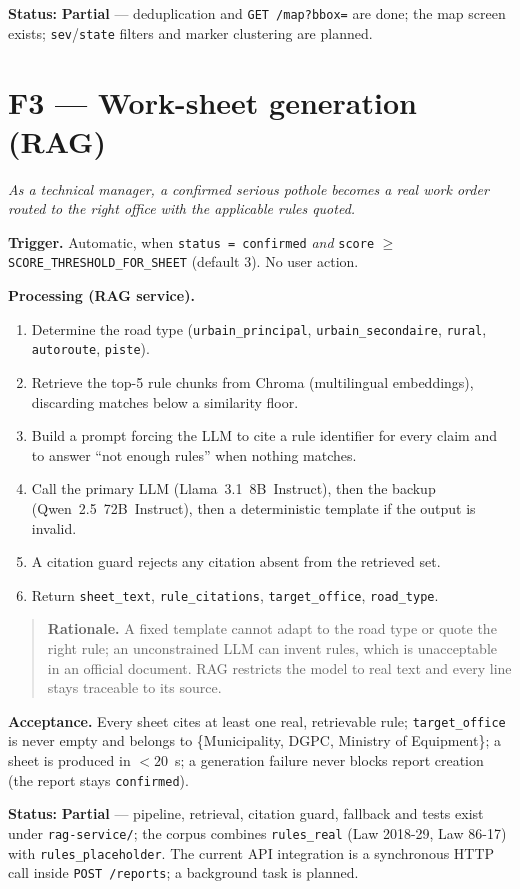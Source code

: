 \documentclass[11pt,a4paper,oneside]{report}
\newcommand{\sPart}{\textcolor{warnorange}{\textbf{Partial}}}
\newcommand{\why}[1]{\begin{quote}\small\textbf{Rationale.} #1\end{quote}}
\begin{document}
\textbf{Status:} \sPart{} --- deduplication and \texttt{GET /map?bbox=} are done; the map screen exists;
\texttt{sev}/\texttt{state} filters and marker clustering are planned.

\section{F3 --- Work-sheet generation (RAG)}
\textit{As a technical manager, a confirmed serious pothole becomes a real work order routed to the right
office with the applicable rules quoted.}

\textbf{Trigger.} Automatic, when \texttt{status = confirmed} \emph{and} \texttt{score} $\geq$
\texttt{SCORE\_THRESHOLD\_FOR\_SHEET} (default 3). No user action.

\textbf{Processing (RAG service).}
\begin{enumerate}
\item Determine the road type (\texttt{urbain\_principal}, \texttt{urbain\_secondaire}, \texttt{rural}, \texttt{autoroute}, \texttt{piste}).
\item Retrieve the top-5 rule chunks from Chroma (multilingual embeddings), discarding matches below a similarity floor.
\item Build a prompt forcing the LLM to cite a rule identifier for every claim and to answer ``not enough rules'' when nothing matches.
\item Call the primary LLM (Llama~3.1~8B~Instruct), then the backup (Qwen~2.5~72B~Instruct), then a deterministic template if the output is invalid.
\item A citation guard rejects any citation absent from the retrieved set.
\item Return \texttt{sheet\_text}, \texttt{rule\_citations}, \texttt{target\_office}, \texttt{road\_type}.
\end{enumerate}
\why{A fixed template cannot adapt to the road type or quote the right rule; an unconstrained LLM can invent
rules, which is unacceptable in an official document. RAG restricts the model to real text and every line
stays traceable to its source.}

\textbf{Acceptance.} Every sheet cites at least one real, retrievable rule; \texttt{target\_office} is never
empty and belongs to \{Municipality, DGPC, Ministry of Equipment\}; a sheet is produced in $<20$~s; a
generation failure never blocks report creation (the report stays \texttt{confirmed}).

\textbf{Status:} \sPart{} --- pipeline, retrieval, citation guard, fallback and tests exist under
\texttt{rag-service/}; the corpus combines \texttt{rules\_real} (Law 2018-29, Law 86-17) with
\texttt{rules\_placeholder}. The current API integration is a synchronous HTTP call inside \texttt{POST /reports};
a background task is planned.
\end{document}

